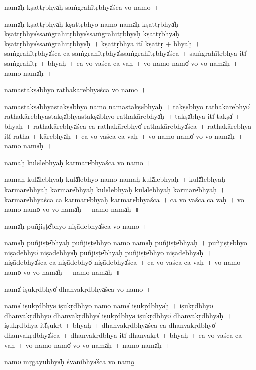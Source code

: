 \documentclass[parskip, DIV=14]{scrartcl}
\begin{document}
{nama̍ḥ kṣa॒ttṛbhya̍ḥ saṁgrahī॒tṛbhya̍śca vo॒ namo॒~।

nama̍ḥ kṣa॒ttṛbhya̍ḥ kṣa॒ttṛbhyo॒ namo॒ nama̍ḥ kṣa॒ttṛbhya̍ḥ~।
kṣa॒ttṛbhya̍ssaṁgrahī॒tṛbhya̍ssaṁgrahī॒tṛbhya̍ḥ kṣa॒ttṛbhya̍ḥ kṣa॒ttṛbhya̍ssaṁgrahī॒tṛbhya̍ḥ~।
kṣa॒ttṛbhya॒ iti̍ kṣa॒ttṛ + bhya॒ḥ~।
sa॒ṁgra॒hī॒tṛbhya̍śca ca  saṁgrahī॒tṛbhya̍ssaṁgrahī॒tṛbhya̍śca~।
sa॒ṁgra॒hī॒tṛbhya॒ iti̍ saṁgrahī॒tṛ + bhya॒ḥ~।
ca॒ vo॒ va॒śca॒ ca॒ va॒ḥ~।
vo॒ namo॒ namo̍ vo vo॒ nama̍ḥ~।
namo॒ nama̍ḥ~॥ 

nama॒stakṣa̍bhyo rathakā॒rebhya̍śca vo॒ namo॒~।

nama॒stakṣa̍bhya॒stakṣa̍bhyo॒ namo॒ nama॒stakṣa̍bhyaḥ~।
takṣa̍bhyo rathakā॒rebhyo̍ rathakā॒rebhya॒stakṣa̍bhya॒stakṣa̍bhyo rathakā॒rebhya̍ḥ~।
takṣa̍bhya॒ iti̍ takṣa̍ + bhya॒ḥ~।
ra॒tha॒kā॒rebhya̍śca ca rathakā॒rebhyo̍ rathakā॒rebhya̍śca~।
ra॒tha॒kā॒rebhya॒ iti̍ ratha + kā॒rebhya̍ḥ~।
ca॒ vo॒ va॒śca॒ ca॒ va॒ḥ~।
vo॒ namo॒ namo̍ vo vo॒ nama̍ḥ~।
namo॒ nama̍ḥ~॥ 

nama॒ḥ kulā̍lebhyaḥ ka॒rmāre̎bhyaśca vo॒ namo॒~।

nama॒ḥ kulā̍lebhya॒ḥ kulā̍lebhyo॒ namo॒ nama॒ḥ kulā̍lebhyaḥ~।
kulā̍lebhyaḥ ka॒rmāre̎bhyaḥ ka॒rmāre̎bhya॒ḥ kulā̍lebhya॒ḥ kulā̍lebhyaḥ ka॒rmāre̎bhyaḥ~।
ka॒rmāre̎bhyaśca ca ka॒rmāre̎bhyaḥ ka॒rmāre̎bhyaśca~।
ca॒ vo॒ va॒śca॒ ca॒ va॒ḥ~।
vo॒ namo॒ namo̍ vo vo॒ nama̍ḥ~।
namo॒ nama̍ḥ~॥ 

nama̍ḥ pu॒ñjiṣṭe̎bhyo niṣā॒debhya̍śca vo॒ namo॒~।

nama̍ḥ pu॒ñjiṣṭe̎bhyaḥ pu॒ñjiṣṭe̎bhyo॒ namo॒ nama̍ḥ pu॒ñjiṣṭe̎bhyaḥ~।
pu॒ñjiṣṭe̎bhyo niṣā॒debhyo̍ niṣā॒debhya̍ḥ pu॒ñjiṣṭe̎bhyaḥ pu॒ñjiṣṭe̎bhyo niṣā॒debhya̍ḥ~।
ni॒ṣā॒debhya̍śca ca niṣā॒debhyo̍ niṣā॒debhya̍śca~।
ca॒ vo॒ va॒śca॒ ca॒ va॒ḥ~।
vo॒ namo॒ namo̍ vo vo॒ nama̍ḥ~।
namo॒ nama̍ḥ~॥ 

nama̍ iṣu॒kṛdbhyo̍ dhanva॒kṛdbhya̍śca vo॒ namo॒~।

nama̍ iṣu॒kṛdbhya̍ iṣu॒kṛdbhyo॒ namo॒ nama̍ iṣu॒kṛdbhya̍ḥ~।  
i॒ṣu॒kṛdbhyo̍ dhanva॒kṛdbhyo̍ dhanva॒kṛdbhya̍  iṣu॒kṛdbhya̍ iṣu॒kṛdbhyo̍ dhanva॒kṛdbhya̍ḥ~।
i॒ṣu॒kṛdbhya॒ itī̍ṣu॒kṛt + bhya॒ḥ~।
dha॒nva॒kṛdbhya̍śca ca dhanva॒kṛdbhyo̍ dhanva॒kṛdbhya̍śca~।
dha॒nva॒kṛdbhya॒ iti̍ dhanva॒kṛt + bhya॒ḥ~।
ca॒ vo॒ va॒śca॒ ca॒ va॒ḥ~।
vo॒ namo॒ namo̍ vo vo॒ nama̍ḥ~।
namo॒ nama̍ḥ~॥ 

namo̍ mṛga॒yubhya̍ḥ śva॒nibhya̍śca vo॒ namo̱॒~।

}
\end{document}
